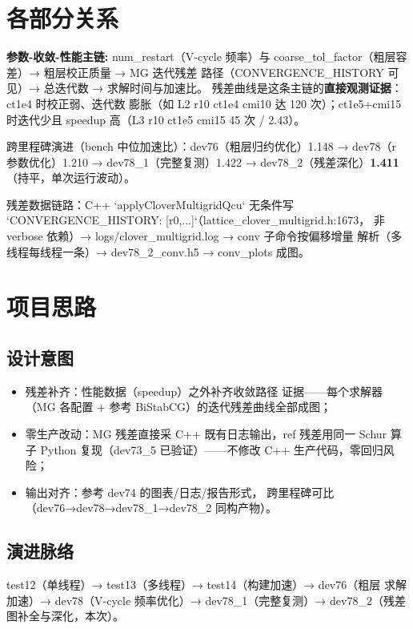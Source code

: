 \documentclass[UTF8]{ctexart}
\begin{document}
\section{各部分关系}
\begin{keybox}
\textbf{参数-收敛-性能主链:} \textcolor{relation}{num\_restart（V-cycle
频率）与 coarse\_tol\_factor（粗层容差）→ 粗层校正质量 → MG 迭代残差
路径（CONVERGENCE\_HISTORY 可见）→ 总迭代数 → 求解时间与加速比。}
残差曲线是这条主链的\textbf{直接观测证据}：ct1e4 时校正弱、迭代数
膨胀（如 L2 r10 ct1e4 cmi10 达 120 次）；ct1e5+cmi15 时迭代少且
speedup 高（L3 r10 ct1e5 cmi15 45 次 / 2.43）。
\end{keybox}

跨里程碑演进（bench 中位加速比）：dev76（粗层归约优化）1.148 →
dev78（r 参数优化）1.210 → dev78\_1（完整复测）1.422 →
dev78\_2（残差深化）\textbf{1.411}（持平，单次运行波动）。

残差数据链路：C++ `applyCloverMultigridQcu` 无条件写
`CONVERGENCE\_HISTORY: [r0,...]`（lattice\_clover\_multigrid.h:1673，
非 verbose 依赖）→ logs/clover\_multigrid.log → conv 子命令按偏移增量
解析（多线程每线程一条）→ dev78\_2\_conv.h5 → conv\_plots 成图。

\section{项目思路}
\subsection{设计意图}
\begin{itemize}
\item \textcolor{idea}{残差补齐}：性能数据（speedup）之外补齐收敛路径
  证据——每个求解器（MG 各配置 + 参考 BiStabCG）的迭代残差曲线全部成图；
\item \textcolor{idea}{零生产改动}：MG 残差直接采 C++ 既有日志输出，ref
  残差用同一 Schur 算子 Python 复现（dev73\_5 已验证）——不修改 C++
  生产代码，零回归风险；
\item \textcolor{idea}{输出对齐}：参考 dev74 的图表/日志/报告形式，
  跨里程碑可比（dev76→dev78→dev78\_1→dev78\_2 同构产物）。
\end{itemize}
\subsection{演进脉络}
test12（单线程）→ test13（多线程）→ test14（构建加速）→ dev76（粗层
求解加速）→ dev78（V-cycle 频率优化）→ dev78\_1（完整复测）→
dev78\_2（残差图补全与深化，本次）。
\end{document}
